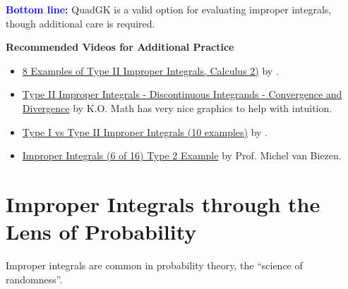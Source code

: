 \Qed

\textcolor{blue}{\bf Bottom line:} QuadGK is a valid option for evaluating improper integrals, though additional care is required. 


\bigskip
\textbf{Recommended Videos for Additional Practice}
\begin{itemize}
    \item \href{https://youtu.be/w46sjRIkV7Y}{8 Examples of Type II Improper Integrals, Calculus 2)} by \bprp.
    \item \href{https://youtu.be/C24iWgk28EU}{Type II Improper Integrals - Discontinuous Integrands - Convergence and Divergence} by K.O. Math has very nice graphics to help with intuition.
    \item \href{https://youtu.be/sjlZ_KX3cqM}{Type I vs Type II Improper Integrals (10 examples)} by \bprp.
    \item \href{https://youtu.be/oq46Nl8W1H0}{Improper Integrals (6 of 16) Type 2 Example} by Prof. Michel van Biezen.
\end{itemize}

\section{Improper Integrals through the Lens of Probability}

Improper integrals are common in probability theory, the ``science of randomness''. 

\bigskip

